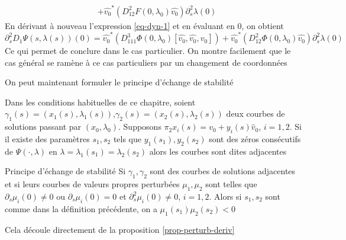 \documentclass[memoire.tex]{subfiles}
\begin{document}
\begin{preuve}
\begin{equation}
\begin{aligned}
            &+\hat{v_0}^*(D^2_{12}F(0,\lambda_0)\hat{v_0})\partial^2_{s}\lambda(0)
        \end{aligned}
    \end{equation}
    En dérivant à nouveau l'expression \eqref{eq-dyn-1} et en évaluant en 0, on obtient
    \begin{equation*}
        \partial^2_s D_1\Psi(s,\lambda(s))(0)=\hat{v_0}^*\left(D^3_{111}\Phi(0,\lambda_0)[\hat{v_0},\hat{v_0},\hat{v_0}]\right)+\hat{v_0}^{*}(D^2_{12}\Phi(0,\lambda_0)\hat{v_0})\partial^2_s\lambda(0)
    \end{equation*}
    Ce qui permet de conclure dans le cas particulier. On montre facilement que le cas général se ramène à ce cas particuliers par un changement de coordonnées
\end{preuve}
On peut maintenant formuler le principe d'échange de stabilité
\begin{definition}
    Dans les conditions habituelles de ce chapitre,
    soient \\
    $\gamma_1(s)=\left(x_1(s),\lambda_1(s)\right)$,$\gamma_2(s)=\left(x_2(s),\lambda_2(s)\right)$ deux courbes de solutions passant par $(x_0,\lambda_0)$. Supposons $\pi_2x_i(s)=v_0+y_i(s)\hat{v}_0$, $i=1,2$. Si il existe des paramètres $s_1,s_2$ tels que $y_1(s_1),y_2(s_2)$ sont des zéros consécutifs de $\Psi(\cdot,\lambda)$ en $\lambda=\lambda_1(s_1)=\lambda_2(s_2)$ alors les courbes sont dites adjacentes
\end{definition}

\begin{theobox}{Principe d'échange de stabilité}{}
    Si $\gamma_1,\gamma_2$ sont des courbes de solutions adjacentes et si leurs courbes de valeurs propres perturbées $\mu_1,\mu_2$ sont telles que $\partial_s\mu_i(0)\neq 0$ ou $\partial_s\mu_i(0)=0$ et $\partial^2_s\mu_i(0)\neq 0$, $i=1,2$. Alors si $s_1,s_2$ sont comme dans la définition précédente, on a $\mu_1(s_1)\mu_2(s_2)<0$
\end{theobox}
\begin{preuve}
    Cela découle directement de la proposition \ref{prop-perturb-deriv}
\end{preuve}
\end{document}
